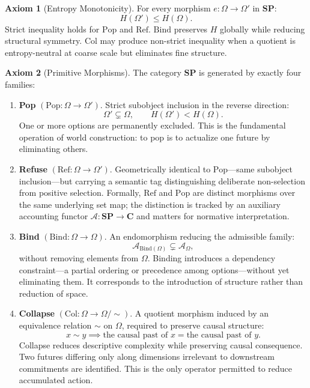 \documentclass[12pt, a4paper]{article}
\theoremstyle{definition}
\newtheorem{axiom}{Axiom}
\theoremstyle{remark}
\newcommand{\Ent}{H}
\newcommand{\SP}{\mathbf{SP}}
\newcommand{\Pop}{\mathrm{Pop}}
\newcommand{\Refuse}{\mathrm{Ref}}
\newcommand{\Bind}{\mathrm{Bind}}
\newcommand{\Collapse}{\mathrm{Col}}
\begin{document}
\begin{axiom}[Entropy Monotonicity]
\label{ax:ent}
For every morphism $e : \Omega \to \Omega'$ in $\SP$:
\[
  \Ent(\Omega') \le \Ent(\Omega).
\]
Strict inequality holds for $\Pop$ and $\Refuse$. $\Bind$ preserves $\Ent$ globally
while reducing structural symmetry. $\Collapse$ may produce non-strict inequality when
a quotient is entropy-neutral at coarse scale but eliminates fine structure.
\end{axiom}

\begin{axiom}[Primitive Morphisms]
\label{ax:prim}
The category $\SP$ is generated by exactly four families:

\begin{enumerate}[label=(\roman*), leftmargin=2em]

\item \textbf{Pop} $(\Pop : \Omega \to \Omega')$. Strict subobject inclusion in
the reverse direction:
\[
  \Omega' \subsetneq \Omega, \qquad \Ent(\Omega') < \Ent(\Omega).
\]
One or more options are permanently excluded. This is the fundamental operation
of world construction: to pop is to actualize one future by eliminating others.

\item \textbf{Refuse} $(\Refuse : \Omega \to \Omega')$. Geometrically identical to
$\Pop$—same subobject inclusion—but carrying a semantic tag distinguishing deliberate
non-selection from positive selection. Formally, $\Refuse$ and $\Pop$ are distinct
morphisms over the same underlying set map; the distinction is tracked by an
auxiliary accounting functor $\mathcal{A} : \SP \to \mathbf{C}$ and matters for
normative interpretation.

\item \textbf{Bind} $(\Bind : \Omega \to \Omega)$. An endomorphism reducing the
admissible family:
\[
  \mathcal{A}_{\Bind(\Omega)} \subsetneq \mathcal{A}_\Omega,
\]
without removing elements from $\Omega$. Binding introduces a dependency constraint—a
partial ordering or precedence among options—without yet eliminating them. It
corresponds to the introduction of structure rather than reduction of space.

\item \textbf{Collapse} $(\Collapse : \Omega \to \Omega/{\sim})$. A quotient morphism
induced by an equivalence relation $\sim$ on $\Omega$, required to preserve causal
structure:
\[
  x \sim y \implies \text{the causal past of } x = \text{the causal past of } y.
\]
Collapse reduces descriptive complexity while preserving causal consequence. Two
futures differing only along dimensions irrelevant to downstream commitments are
identified. This is the only operator permitted to reduce accumulated action.
\end{enumerate}
\end{axiom}
\end{document}
